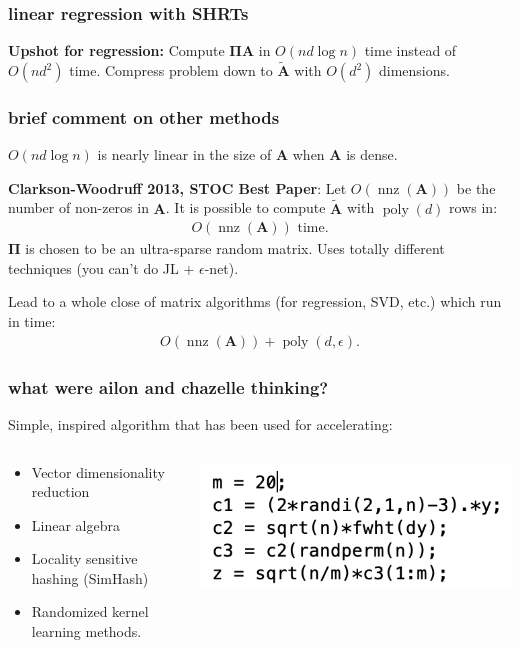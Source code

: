 \documentclass[compress]{beamer}
\newcommand{\bs}[1]{\boldsymbol{#1}}
\newcommand{\bv}[1]{\mathbf{#1}}
\DeclareMathOperator{\nnz}{nnz}
\DeclareMathOperator{\poly}{poly}
\begin{document}
\begin{frame}[t]
	\frametitle{linear regression with SHRTs}

\textbf{Upshot for regression:} Compute $\bs{\Pi}\bv{A}$ in \alert{$O(nd\log n)$ time} instead of $O(nd^2)$ time. Compress problem down to $\tilde{\bv{A}}$ with $O(d^2)$ dimensions. 
\end{frame}

\begin{frame}[t]
	\frametitle{brief comment on other methods}
	$O(nd\log n)$ is nearly linear in the size of $\bv{A}$ when $\bv{A}$ is dense. 
	\vspace{1em}
	
	\textbf{Clarkson-Woodruff 2013, STOC Best Paper}: Let $O\left(\nnz(\bv{A})\right)$ be the number of non-zeros in $\bv{A}$. It is possible to compute $\tilde{\bv{A}}$ with $\poly(d)$ rows in:
	\begin{align*}
	O\left(\nnz(\bv{A})\right) \text{ time.}
	\end{align*}
	$\bs{\Pi}$ is chosen to be an ultra-sparse random matrix. Uses totally different techniques (you can't do JL + $\epsilon$-net). 
	
	Lead to a whole close of matrix algorithms (for regression, SVD, etc.) which run in time:
	\begin{align*}
		O\left(\nnz(\bv{A})\right)  + \poly(d,\epsilon).
	\end{align*}
\end{frame}

\begin{frame}[t]
	\frametitle{what were ailon and chazelle thinking?}
Simple, inspired algorithm that has been used for accelerating:
\begin{columns}
	\begin{column}{.5\textwidth}
		\footnotesize{
		\begin{itemize}
			\item Vector dimensionality reduction
			\item Linear algebra
			\item Locality sensitive hashing (SimHash)
			\item Randomized kernel learning methods.
		\end{itemize}
	}
	\end{column}
	\begin{column}{.5\textwidth}
		\includegraphics[width=\textwidth]{fastJL.png}
\end{column}
\end{columns}
\end{frame}
\end{document}
